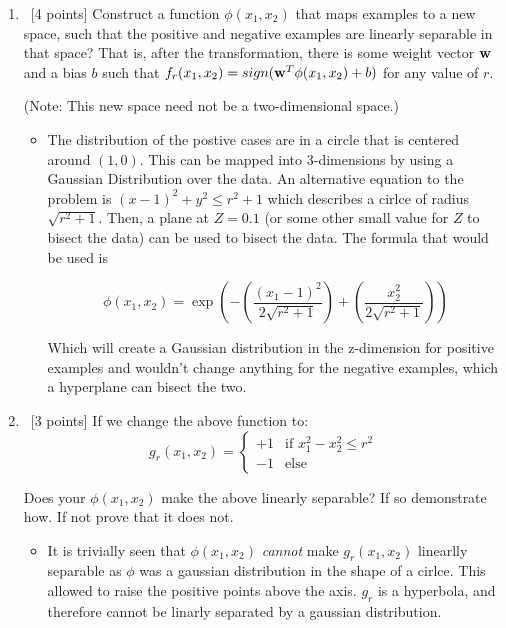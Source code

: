 \begin{enumerate}
\item ~[4 points] Construct a function $\phi(x_1,x_2)$ that maps
  examples to a new space, such that the positive and negative
  examples are linearly separable in that space? That is, after the
  transformation, there is some weight vector ${\bf w}$ and a bias $b$
  such that $f_r(x_1, x_2) = sign({\bf w}^T\phi(x_1, x_2) + b)$ for any
  value of $r$.

  (Note: This new space need not be a two-dimensional space.)

  \begin{itemize}
    \item The distribution of the postive cases are in a circle that is centered around $(1,0)$. This can be mapped into 3-dimensions by using a Gaussian Distribution over the data. An alternative equation to the problem is $(x-1)^{2}+y^{2}\leq r^{2}+1$ which describes a cirlce of radius $\sqrt{r^{2}+1}$. Then, a plane at $Z=0.1$ (or some other small value for $Z$ to bisect the data) can be used to bisect the data. The formula that would be used is

\[
\phi(x_{1},x_{2}) = \exp\left(-\left(\frac{(x_{1}-1)^{2}}{2\sqrt{r^{2}+1}}\right) + \left(\frac{x_{2}^{2}}{2\sqrt{r^{2}+1}} \right)  \right)
\]

Which will create a Gaussian distribution in the z-dimension for positive examples and wouldn't change anything for the negative examples, which a hyperplane can bisect the two.
  \end{itemize}

\item ~[3 points] If we change the above function to: 
  \[
  g_r(x_1,x_2) = 
  \begin{cases}
    +1 & \text{if } x_1^2 -x_2^2 \leq r^2 \\
    -1 & \text{else}
  \end{cases}
  \]

  Does your $\phi(x_1,x_2)$ make the above linearly separable?  If so
  demonstrate how. If not prove that it does not.

\begin{itemize}
  \item It is trivially seen that $\phi(x_{1},x_{2})$ {\em cannot} make $g_{r}(x_{1},x_{2})$ linearlly separable as $\phi$ was a gaussian distribution in the shape of a cirlce. This allowed to raise the positive points above the axis. $g_{r}$ is a hyperbola, and therefore cannot be linarly separated by a gaussian distribution.
\end{itemize}


\end{enumerate}
